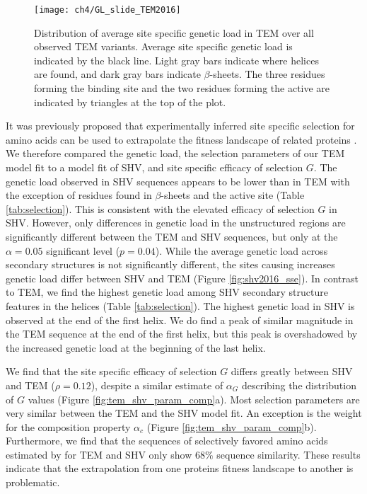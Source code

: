 \singlespacing
\begin{figure}
     \centering
	\texttt{[image: ch4/GL\_slide\_TEM2016]}
	\caption{Distribution of average site specific genetic load in TEM over all observed TEM variants. 
	Average site specific genetic load is indicated by the black line. 
	Light gray bars indicate where helices are found, and dark gray bars indicate $\beta$-sheets.
	The three residues forming the binding site and the two residues forming the active are indicated by triangles at the top of the plot.}
	\label{fig:tem2016_sse}
\end{figure}
\doublespacing

It was previously proposed that experimentally inferred site specific selection for amino acids can be used to extrapolate the fitness landscape of related proteins \citep{bloom2014, bloom2017}.
We therefore compared the genetic load, the \selac selection parameters of our \selac TEM model fit to a \selac model fit of SHV, and site specific efficacy of selection $G$.
The genetic load observed in SHV sequences appears to be lower than in TEM with the exception of residues found in $\beta$-sheets and the active site (Table \ref{tab:selection}).
This is consistent with the elevated efficacy of selection $G$ in SHV.
However, only differences in genetic load in the unstructured regions are significantly different between the TEM and SHV sequences, but only at the $\alpha = 0.05$ significant level ($p = 0.04$).
While the average genetic load across secondary structures is not significantly different, the sites causing increases genetic load differ between SHV and TEM (Figure \ref{fig:shv2016_sse}).
In contrast to TEM, we find the highest genetic load among SHV secondary structure features in the helices (Table \ref{tab:selection}).
The highest genetic load in SHV is observed at the end of the first helix.
We do find a peak of similar magnitude in the TEM sequence at the end of the first helix, but this peak is overshadowed by the increased genetic load at the beginning of the last helix.

We find that the site specific efficacy of selection $G$ differs greatly between SHV and TEM ($\rho = 0.12$), despite a similar estimate of $\alpha_G$ describing the distribution of $G$ values (Figure \ref{fig:tem_shv_param_comp}a).
Most \selac selection parameters are very similar between the TEM and the SHV model fit. 
An exception is the weight for the \PC composition property $\alpha_c$ (Figure \ref{fig:tem_shv_param_comp}b).
Furthermore, we find that the sequences of selectively favored amino acids estimated by \selac for TEM and SHV only show $68 \%$ sequence similarity.
These results indicate that the extrapolation from one proteins fitness landscape to another is problematic. 


